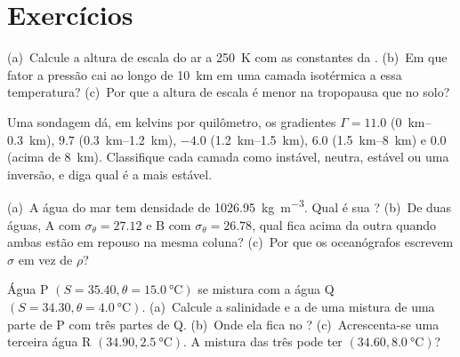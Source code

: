 \section{Exercícios}

\begin{exercise}[$\star$]\label{exo:b1:fluid-envelopes-structure:1}
(a)~Calcule a altura de escala do ar a \qty{250}{K} com as constantes da .
(b)~Em que fator a pressão cai ao longo de \qty{10}{km} em uma camada isotérmica a essa
temperatura? (c)~Por que a altura de escala é menor na tropopausa que no solo?
\end{exercise}

\begin{exercise}[$\star$]\label{exo:b1:fluid-envelopes-structure:2}
Uma sondagem dá, em kelvins por quilômetro, os gradientes $\Gamma = 11.0$
(\qtyrange{0}{0.3}{km}), $9.7$ (\qtyrange{0.3}{1.2}{km}), $-4.0$
(\qtyrange{1.2}{1.5}{km}), $6.0$ (\qtyrange{1.5}{8}{km}) e $0.0$ (acima de
\qty{8}{km}). Classifique cada camada como instável, neutra, estável ou uma inversão, e diga qual
é a mais estável.
\end{exercise}

\begin{exercise}[$\star$]\label{exo:b1:fluid-envelopes-structure:3}
(a)~A água do mar tem densidade de \qty{1026.95}{kg.m^{-3}}. Qual é sua ?
(b)~De duas águas, A com $\sigma_\theta = 27.12$ e B com $\sigma_\theta = 26.78$, qual fica acima
da outra quando ambas estão em repouso na mesma coluna? (c)~Por que os oceanógrafos escrevem
$\sigma$ em vez de $\rho$?
\end{exercise}

\begin{exercise}[$\star$]\label{exo:b1:fluid-envelopes-structure:4}
Água P $(S = 35.40, \theta = \qty{15.0}{\celsius})$ se mistura com a água Q $(S =
34.30, \theta = \qty{4.0}{\celsius})$. (a)~Calcule a salinidade e a  de uma
mistura de uma parte de P com três partes de Q. (b)~Onde ela fica no ?
(c)~Acrescenta-se uma terceira água R $(34.90,
\qty{2.5}{\celsius})$. A mistura das três pode ter $(34.60, \qty{8.0}{\celsius})$?
\end{exercise}

